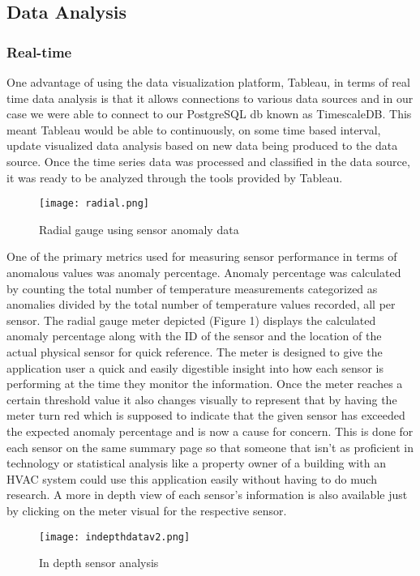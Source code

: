 \documentclass[conference]{IEEEtran}
\begin{document}
\subsection{Data Analysis }
\subsubsection{Real-time}
One advantage of using the data visualization platform, Tableau, in terms of real time data analysis is that it allows connections to various data sources and in our case we were able to connect to our PostgreSQL db known as TimescaleDB. This meant Tableau would be able to continuously, on some time based interval, update visualized data analysis based on new data being produced to the data source. Once the time series data was processed and classified in the data source, it was ready to be analyzed through the tools provided by Tableau.

\begin{figure}[h]
\texttt{[image: radial.png]}
\centering
\caption{Radial gauge using sensor anomaly data}
\end{figure}

One of the primary metrics used for measuring sensor performance in terms of anomalous values was anomaly percentage. Anomaly percentage was calculated by counting the total number of temperature measurements categorized as anomalies divided by the total number of temperature values recorded, all per sensor. The radial gauge meter depicted (Figure 1) displays the calculated anomaly percentage along with the ID of the sensor and the location of the actual physical sensor for quick reference. The meter is designed to give the application user a quick and easily digestible insight into how each sensor is performing at the time they monitor the information. Once the meter reaches a certain threshold value it also changes visually to represent that by having the meter turn red which is supposed to indicate that the given sensor has exceeded the expected anomaly percentage and is now a cause for concern. This is done for each sensor on the same summary page so that someone that isn’t as proficient in technology or statistical analysis like a property owner of a building with an HVAC system could use this application easily without having to do much research. A more in depth view of each sensor’s information is also available just by clicking on the meter visual for the respective sensor. 

\begin{figure}[h]
\texttt{[image: indepthdatav2.png]}
\centering
\caption{In depth sensor analysis}
\end{figure}
\end{document}
